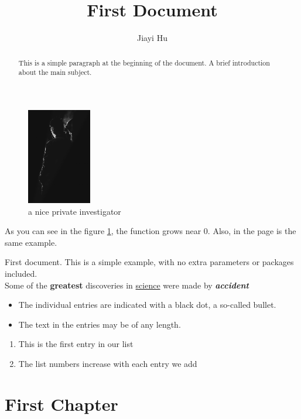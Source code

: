 \documentclass{report}
\title{First Document}
\author{Jiayi Hu}
\begin{document}
\maketitle

\tableofcontents

\begin{abstract}
	This is a simple paragraph at the beginning of the document. A brief introduction about the main subject.
\end{abstract}

\begin{figure}[h]
	\centering
	\includegraphics[width=0.25\textwidth]{private}
	\caption{a nice private investigator}
	\label{fig:mesh1}
\end{figure}

As you can see in the figure \ref{fig:mesh1}, the function grows near 0. Also, in the page \pageref{fig:mesh1} is the same example.

First document. This is a simple example, with no 
extra parameters or packages included. \\

Some of the \textbf{greatest} discoveries in \underline{science} were made by \textbf{\textit{accident}}

\begin{itemize}
	\item The individual entries are indicated with a black dot, a so-called bullet.
	\item The text in the entries may be of any length.
\end{itemize}

\begin{enumerate}
	\item This is the first entry in our list
	\item The list numbers increase with each entry we add
\end{enumerate}

\chapter{First Chapter}
\end{document}
